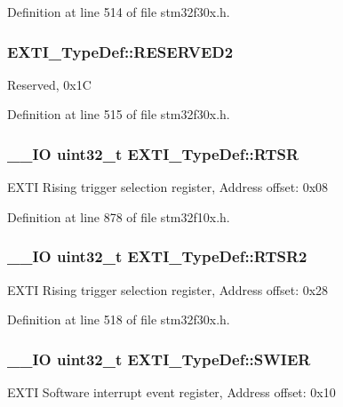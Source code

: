 Definition at line 514 of file stm32f30x.\-h.

\hypertarget{struct_e_x_t_i___type_def_ae89cc25b732d7992ed136ee137ddd7d4}{
\subsubsection[{R\-E\-S\-E\-R\-V\-E\-D2}]{ E\-X\-T\-I\-\_\-\-Type\-Def\-::\-R\-E\-S\-E\-R\-V\-E\-D2}}\label{struct_e_x_t_i___type_def_ae89cc25b732d7992ed136ee137ddd7d4}
Reserved, 0x1\-C 

Definition at line 515 of file stm32f30x.\-h.

\hypertarget{struct_e_x_t_i___type_def_ac019d211d8c880b327a1b90a06cc0675}{
\subsubsection[{R\-T\-S\-R}]{\setlength{\rightskip}{0pt plus 5cm}\-\_\-\-\_\-\-I\-O {\bf uint32\-\_\-t} E\-X\-T\-I\-\_\-\-Type\-Def\-::\-R\-T\-S\-R}}\label{struct_e_x_t_i___type_def_ac019d211d8c880b327a1b90a06cc0675}
E\-X\-T\-I Rising trigger selection register, Address offset\-: 0x08 

Definition at line 878 of file stm32f10x.\-h.

\hypertarget{struct_e_x_t_i___type_def_a9670b69baeb2f676b54403a6fd7482dc}{
\subsubsection[{R\-T\-S\-R2}]{\setlength{\rightskip}{0pt plus 5cm}\-\_\-\-\_\-\-I\-O {\bf uint32\-\_\-t} E\-X\-T\-I\-\_\-\-Type\-Def\-::\-R\-T\-S\-R2}}\label{struct_e_x_t_i___type_def_a9670b69baeb2f676b54403a6fd7482dc}
E\-X\-T\-I Rising trigger selection register, Address offset\-: 0x28 

Definition at line 518 of file stm32f30x.\-h.

\hypertarget{struct_e_x_t_i___type_def_a5c1f538e64ee90918cd158b808f5d4de}{
\subsubsection[{S\-W\-I\-E\-R}]{\setlength{\rightskip}{0pt plus 5cm}\-\_\-\-\_\-\-I\-O {\bf uint32\-\_\-t} E\-X\-T\-I\-\_\-\-Type\-Def\-::\-S\-W\-I\-E\-R}}\label{struct_e_x_t_i___type_def_a5c1f538e64ee90918cd158b808f5d4de}
E\-X\-T\-I Software interrupt event register, Address offset\-: 0x10 

